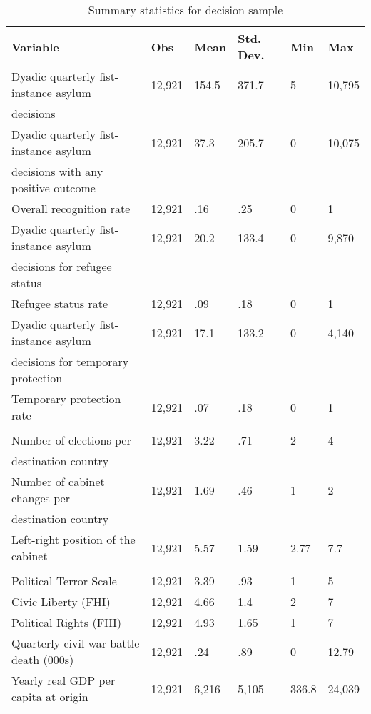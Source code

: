 \begin{table}[htbp]
	\centering
	\footnotesize
	\caption{Summary statistics for decision sample}
	\label{dec_summary_statistics}
\begin{tabularx}{\textwidth}{l YYYYY }\hline\hline
Variable & Obs & Mean & Std. Dev. & Min & Max  \\ \hline
Dyadic quarterly fist-instance asylum  & 12,921 & 154.5 & 371.7 & 5 & 10,795  \\
decisions  & & & &  &   \\
[0.6em]
Dyadic quarterly fist-instance asylum & 12,921 & 37.3 & 205.7 & 0 & 10,075  \\
decisions with any positive outcome & & & &  &   \\
[0.3em]
Overall recognition rate & 12,921 & .16 & .25 & 0 & 1  \\
[0.6em]
Dyadic quarterly fist-instance asylum  & 12,921 & 20.2 & 133.4 & 0 & 9,870  \\
decisions for refugee status & & & &  &   \\
[0.3em]
Refugee status rate & 12,921 & .09 & .18 & 0 & 1  \\
[0.6em]
Dyadic quarterly fist-instance asylum   & 12,921 & 17.1 & 133.2 & 0 & 4,140  \\
decisions for temporary protection& & & &  &   \\
[0.3em]
Temporary protection rate & 12,921 & .07 & .18 & 0 & 1  \\
[0.3em]
\\
Number of elections per  & 12,921 & 3.22 & .71 & 2 & 4  \\
destination country& & & &  &   \\
[0.3em]
Number of cabinet changes per & 12,921 & 1.69 & .46 & 1 & 2  \\
destination country& & & &  &   \\
[0.3em]
Left-right position of the cabinet & 12,921 & 5.57 & 1.59 & 2.77 & 7.7  \\
[0.3em]
\\
Political Terror Scale & 12,921 & 3.39 & .93 & 1 & 5  \\
[0.3em]
Civic Liberty (FHI) & 12,921 & 4.66 & 1.4 & 2 & 7  \\
[0.3em]
Political Rights (FHI) & 12,921 & 4.93 & 1.65 & 1 & 7  \\
[0.3em]
Quarterly civil war battle death (000s) & 12,921 & .24 & .89 & 0 & 12.79  \\
[0.3em]
Yearly real GDP per capita at origin & 12,921 & 6,216 & 5,105 & 336.8 & 24,039  \\

\end{tabularx}
\end{table}
